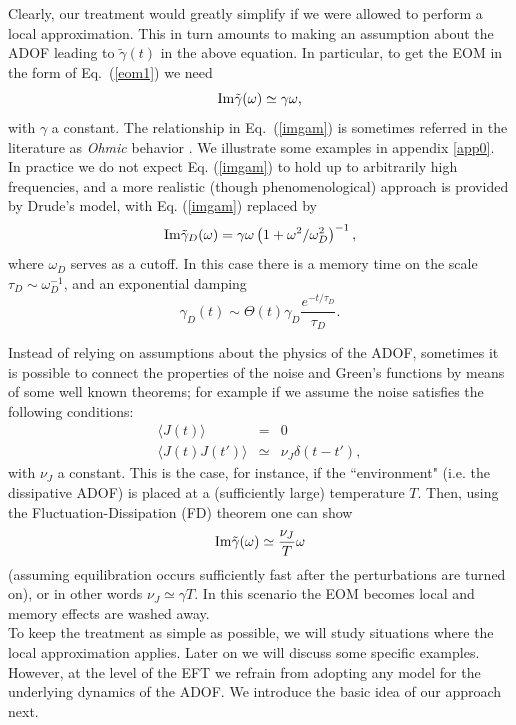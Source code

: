 \documentclass[11pt,amsmath,floats,floatfix,nofootinbib,secnumarabic, superscriptaddress, tightenlines]{revtex4}
\newcommand{\beq}{\begin{equation}}
\newcommand{\eeq}{\end{equation}}
\newcommand{\bea}{\begin{eqnarray}}
\newcommand{\eea}{\end{eqnarray}}
\begin{document}
Clearly,  our treatment would greatly simplify if we were allowed to perform a local approximation. This in turn amounts to making an assumption about the ADOF leading to $\tilde\gamma(t)$ in the above equation. In particular, to get the EOM in the form of Eq.~(\ref{eom1}) we need
\beq
\label{imgam}
{\rm Im} \tilde\gamma(\omega) \simeq  \gamma \omega,
\eeq
with $\gamma$ a constant. The relationship in Eq.~(\ref{imgam}) is sometimes referred in the literature as {\it Ohmic} behavior \cite{weiss}. We illustrate some examples in appendix \ref{app0}.\\

In practice we do not expect Eq. (\ref{imgam}) to hold up to arbitrarily high frequencies, and a more realistic (though phenomenological) approach is provided by Drude's model, with Eq. (\ref{imgam}) replaced by \cite{weiss}
\beq
\label{imdrude}
{\rm Im} \tilde\gamma_D(\omega) = \gamma \omega \left(1+ \omega^2/\omega_D^2\right)^{-1},
\eeq
where $\omega_D$ serves as a cutoff. In this  case there is a memory time on the scale $\tau_D \sim \omega_D^{-1}$, and an exponential damping \beq \gamma_D(t) \sim \Theta(t)\gamma_D
\frac{e^{-t/\tau_D}}{\tau_D}.\label{drude}\eeq

Instead of relying on assumptions about the physics of the ADOF, sometimes it is possible to connect the properties of the noise and Green's functions by means of some well known theorems; for example if we assume the noise satisfies the following conditions:
\bea
\langle J(t) \rangle &=& 0 \\
\langle J(t)J(t') \rangle &\simeq& \nu_J \delta(t-t') \label{whiten},
\eea
 with $\nu_J$ a constant. This is the case, for instance, if the ``environment" (i.e. the dissipative ADOF) is placed at a (sufficiently large) temperature $T$. Then, using the Fluctuation-Dissipation (FD) theorem \cite{calzetta, weiss} one can show 
 \beq
 \label{fdth}
 {\rm Im} \tilde\gamma(\omega) \simeq  \frac{\nu_J}{T} \omega
\eeq
(assuming equilibration occurs sufficiently fast after the perturbations are turned on), or in other words $\nu_J \simeq \gamma T.$ In this scenario the EOM becomes local and memory effects are washed away.\\

To keep the treatment as simple as possible, we will study situations where the local approximation applies. Later on we will discuss some specific examples. However, at the level of the EFT we refrain from adopting any model for the underlying dynamics of the ADOF. We introduce the basic idea of our approach next.
\end{document}
